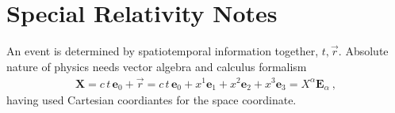 \documentclass[letterpaper,10pt,english]{jupyterBook}
\begin{document}
\chapter{Special Relativity \sphinxhyphen{} Notes}
\label{\detokenize{ch/relativity-special/notes:special-relativity-notes}}\label{\detokenize{ch/relativity-special/notes:relativity-special-notes}}\label{\detokenize{ch/relativity-special/notes::doc}}
\sphinxAtStartPar
An event is determined by spatio\sphinxhyphen{}temporal information together, \(t, \vec{r}\). Absolute nature of physics needs vector algebra and calculus formalism
\begin{equation*}
\begin{split}\mathbf{X} = c  \,t  \,\mathbf{e}_0 + \vec{r} =  c \, t \, \mathbf{e}_0 + x^1 \mathbf{e}_1 + x^2 \mathbf{e}_2 + x^3 \mathbf{e}_3 = X^{\alpha} \mathbf{E}_{\alpha} \ ,\end{split}
\end{equation*}
\sphinxAtStartPar
having used Cartesian coordiantes for the space coordinate.
\end{document}

